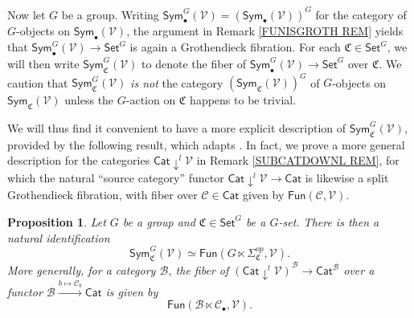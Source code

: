 \documentclass[a4paper,10pt
]{article}%
\numberwithin{equation}{section}
\numberwithin{figure}{section}
\newtheorem{proposition}[equation]{Proposition}%
\theoremstyle{definition} %
\newcommand{\V}{\ensuremath{\mathcal V}}
\newcommand{\1}{\ensuremath{\mathbbm 1}}%
\begin{document}
Now let $G$ be a group. Writing 
$\mathsf{Sym}^G_\bullet(\mathcal{V})
=
\left(\mathsf{Sym}_\bullet(\mathcal{V})\right)^G$
for the category of $G$-objects
on $\mathsf{Sym}_{\bullet}(\V)$,
the argument in Remark \ref{FUNISGROTH REM}
yields that
$\mathsf{Sym}^G_\bullet(\mathcal{V}) \to \mathsf{Set}^G$
is again a Grothendieck fibration.
For each $\mathfrak{C} \in \mathsf{Set}^G$,
we will then write
$\mathsf{Sym}^G_{\mathfrak{C}}(\V)$
to denote the fiber of
$\mathsf{Sym}^G_\bullet(\mathcal{V}) \to \mathsf{Set}^G$
over $\mathfrak{C}$.
We caution that 
$\mathsf{Sym}^G_{\mathfrak{C}}(\V)$
\emph{is not} the category 
$\left(\mathsf{Sym}_{\mathfrak{C}}(\V)\right)^G$
of $G$-objects on $\mathsf{Sym}_{\mathfrak{C}}(\V)$
unless the $G$-action on $\mathfrak{C}$
happens to be trivial.

We will thus find it convenient to have a more explicit description of
$\mathsf{Sym}^G_{\mathfrak{C}}(\V)$,
provided by the following result, 
which adapts
\cite[Lemma A.6]{BP21}.
In fact, we prove a more general description
for the categories $\mathsf{Cat} \downarrow^l \mathcal{V}$
in Remark \ref{SUBCATDOWNL REM},
for which the natural ``source category'' functor
$\mathsf{Cat} \downarrow^l \mathcal{V} \to \mathsf{Cat}$
is likewise a split Grothendieck fibration,
with fiber over $\mathcal{C} \in \mathsf{Cat}$
given by $\mathsf{Fun}(\mathcal{C},\mathcal{V})$.



\begin{proposition}\label{EQUIVFNCON PROP}
	Let $G$ be a group and $\mathfrak{C} \in \mathsf{Set}^G$
	be a $G$-set. There is then a natural identification
	\[
	\mathsf{Sym}^G_{\mathfrak{C}}(\V)
	\simeq
	\mathsf{Fun}(G \ltimes \Sigma^{op}_{\mathfrak{C}},\V).
	\]
	More generally, for a category $\mathcal{B}$,
	the fiber of
	$\left(\mathsf{Cat} \downarrow^l \V \right)^{\mathcal{B}}
	\to \mathsf{Cat}^{\mathcal{B}}$
	over a functor
	$\mathcal{B} \xrightarrow{b \mapsto \mathcal{C}_b} \mathsf{Cat}$
	is given by
	\begin{equation}\label{FUNBLTICV EQ}
	\mathsf{Fun}(\mathcal{B} \ltimes \mathcal{C}_{\bullet},\V).
	\end{equation}
\end{proposition}
\end{document}
